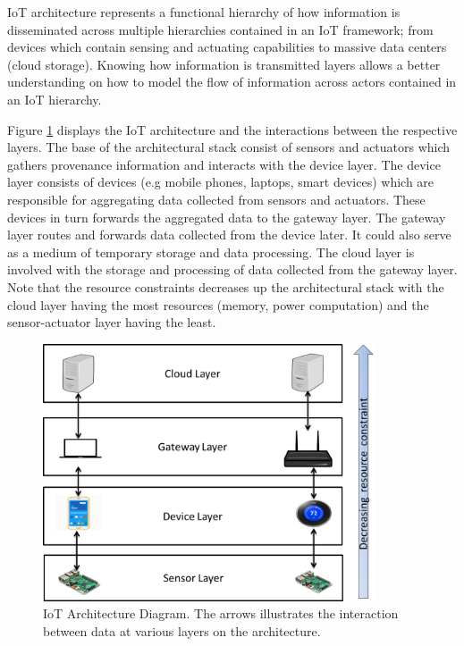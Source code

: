 IoT architecture represents a functional hierarchy of how information is disseminated across multiple hierarchies contained in an IoT framework; from devices which contain sensing and actuating capabilities to massive data centers (cloud storage). Knowing how information is transmitted layers allows a better understanding on how to model the flow of information across actors contained in an IoT hierarchy. 
\par Figure \ref{iot_architecture} displays the IoT architecture and the interactions between the respective  layers. The base of the architectural stack consist of sensors and actuators which gathers provenance information and interacts with the device layer. The device layer consists of devices (e.g mobile phones, laptops, smart devices) which are responsible for aggregating data collected from sensors and actuators. These devices in turn forwards the aggregated data to the gateway layer. The gateway layer routes and forwards data collected from the device later. It could also serve as a medium of temporary storage and data processing. The cloud layer is involved with the storage and processing of data collected from the gateway layer. Note that the resource constraints decreases up the architectural stack with the cloud layer having the most resources (memory, power computation) and the sensor-actuator layer having the least. 


\begin{figure}[h]
\begin{center}

\includegraphics[height=3.0in]{iot_architecture.png}
\end{center}
\caption{IoT Architecture Diagram. The arrows illustrates the interaction between data at various layers on the architecture.}
\label{iot_architecture}

\end{figure}



